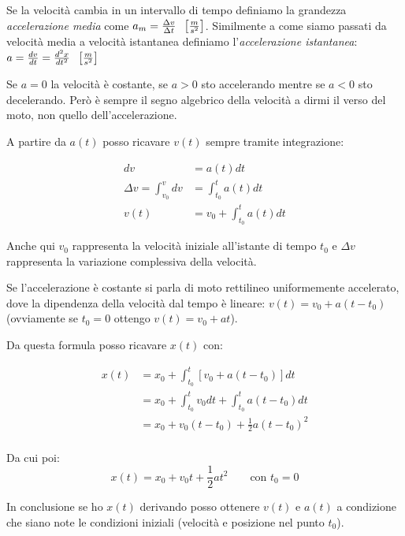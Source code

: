 \documentclass[class=book, crop=false, oneside, 12pt]{standalone}
\begin{document}
Se la velocità cambia in un intervallo di tempo definiamo la grandezza
\emph{accelerazione media} come \(a_m = \frac{\Delta v} {\Delta t} \hspace{0.2cm} \left[\frac{m}{s^2}\right]\).
Similmente a come siamo passati da velocità media a velocità istantanea
definiamo l'\emph{accelerazione istantanea}:
\(a = \frac {dv} {dt} = \frac {d^2 x}{dt^2} \hspace{0.2cm} \left[\frac{m}{s^2}\right]\)

Se \(a=0\) la velocità è costante, se \(a>0\) sto accelerando mentre se
\(a<0\) sto decelerando. Però è sempre il segno algebrico della velocità
a dirmi il verso del moto, non quello dell'accelerazione.

A partire da \(a(t)\) posso ricavare \(v(t)\) sempre tramite
integrazione:

\begin{equation}
  \begin{aligned}
    dv &= a(t) dt\\
    \Delta v = \int_{v_0}^{v}dv &= \int_{t_0}^t a(t) dt\\
    v(t) &= v_0 + \int_{t_0}^{t} a(t) dt
  \end{aligned}
\end{equation}


Anche qui \(v_0\) rappresenta la velocità iniziale all'istante di tempo
\(t_0\) e \(\Delta v\) rappresenta la variazione complessiva
della velocità.

Se l'accelerazione è costante si parla di moto rettilineo uniformemente
accelerato, dove la dipendenza della velocità dal tempo è lineare:
\(v(t) = v_0 + a(t-t_0)\) (ovviamente se \(t_0 = 0\) ottengo
\(v(t) = v_0 + at\)).

Da questa formula posso ricavare \(x(t)\) con:

\begin{equation}
  \begin{aligned}
    x(t) &= x_0 + \int_{t_0}^{t} [v_0 + a(t-t_0)] dt\\
         &= x_0 + \int_{t_0}^{t}v_0 dt+ \int_{t_0}^t a (t-t_0) dt\\
         &= x_0 + v_0(t-t_0) + \frac{1}{2} a(t-t_0)^2\\
  \end{aligned}
\end{equation}

Da cui poi:
\begin{equation}
  x(t) = x_0 + v_0 t + \frac {1} {2} a t^2 \qquad \text{con \(t_0=0\)}
\end{equation}

In conclusione se ho \(x(t)\) derivando posso ottenere \(v(t)\) e
\(a(t)\) a condizione che siano note le condizioni iniziali (velocità e
posizione nel punto \(t_0\)).
\end{document}
